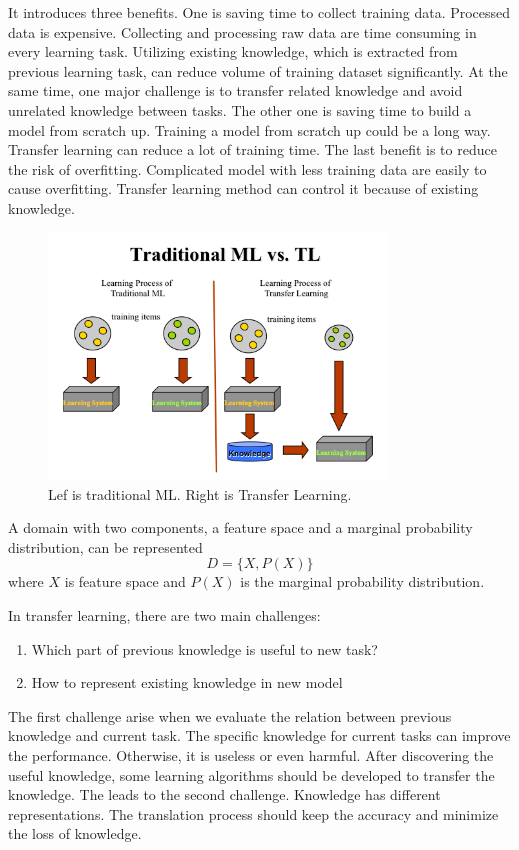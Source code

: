 It introduces three benefits. One is saving time to collect training data.  Processed data is expensive. Collecting and processing raw data are time consuming in every learning task. Utilizing existing knowledge, which is extracted from previous learning task, can reduce volume of training dataset significantly. At the same time, one major challenge is to transfer related knowledge and avoid unrelated knowledge between tasks. The other one is saving time to build a model from scratch up. Training a model from scratch up could be a long way. Transfer learning can reduce a lot of training time. The last benefit is to reduce the risk of overfitting. Complicated model with less training data are easily to cause overfitting. Transfer learning method can control it because of existing knowledge.

\graphicspath{ {./Figures/} }
\begin{figure}[!htb]
\centering
\includegraphics[width=0.8\textwidth]{MLvsTL.png}
\caption{\label{fig:perceptron}Lef is traditional ML. Right is Transfer Learning.}
\end{figure}

A domain with two components, a feature space and a marginal probability distribution, can be represented
\begin{equation}\label{eq:TransLearning}
D = \{ X, P(X) \}
\end{equation}
where $X$ is feature space and $P(X)$ is the marginal probability distribution. 

In transfer learning, there are two main challenges: 
\begin{enumerate}
  \item Which part of previous knowledge is useful to new task?
  \item How to represent existing knowledge in new model
\end{enumerate}
The first challenge arise when we evaluate the relation between previous knowledge and current task. The specific knowledge for current tasks can improve the performance. Otherwise, it is useless or even harmful. After discovering the useful knowledge, some learning algorithms should be developed to transfer the knowledge. The leads to the second challenge. Knowledge has different representations. The translation process should keep the accuracy and minimize the loss of knowledge. 